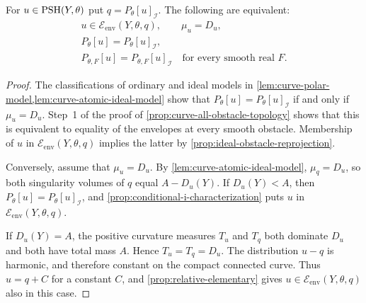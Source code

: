 \begin{corollary}\label{cor:curve-relative-envelope-criterion}
For $u\in\mathrm{PSH}(Y,\theta)$ put $q=P_\theta[u]_{\mathcal I}$. The following are equivalent:
\[
 \begin{gathered}
 u\in\mathcal E_{\mathrm{env}}(Y,\theta,q),\qquad \mu_u=D_u,\\
 P_\theta[u]=P_\theta[u]_{\mathcal I},\\
 P_{\theta,F}[u]=P_{\theta,F}[u]_{\mathcal I}
       \quad\text{for every smooth real }F.
 \end{gathered}
\]
\end{corollary}
\begin{proof}
The classifications of ordinary and ideal models in \cref{lem:curve-polar-model,lem:curve-atomic-ideal-model} show that $P_\theta[u]=P_\theta[u]_{\mathcal I}$ if and only if $\mu_u=D_u$. Step~1 of the proof of \cref{prop:curve-all-obstacle-topology} shows that this is equivalent to equality of the envelopes at every smooth obstacle. Membership of $u$ in $\mathcal E_{\mathrm{env}}(Y,\theta,q)$ implies the latter by \cref{prop:ideal-obstacle-reprojection}.

Conversely, assume that $\mu_u=D_u$. By \cref{lem:curve-atomic-ideal-model}, $\mu_q=D_u$, so both singularity volumes of $q$ equal $A-D_u(Y)$. If $D_u(Y)<A$, then $P_\theta[u]=P_\theta[u]_{\mathcal I}$, and \cref{prop:conditional-i-characterization} puts $u$ in $\mathcal E_{\mathrm{env}}(Y,\theta,q)$.

If $D_u(Y)=A$, the positive curvature measures $T_u$ and $T_q$ both dominate $D_u$ and both have total mass $A$. Hence $T_u=T_q=D_u$. The distribution $u-q$ is harmonic, and therefore constant on the compact connected curve. Thus $u=q+C$ for a constant $C$, and \cref{prop:relative-elementary} gives $u\in\mathcal E_{\mathrm{env}}(Y,\theta,q)$ also in this case.
\end{proof}

